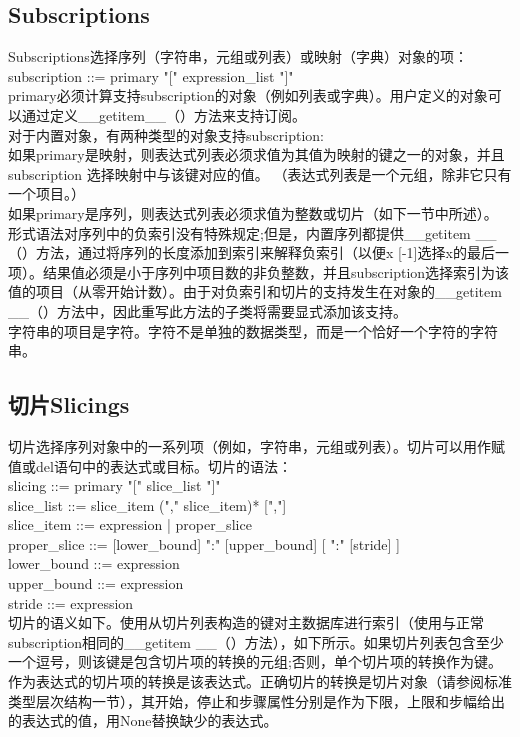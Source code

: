 \documentclass[10pt,UTF8]{ctexart}
\begin{document}
\subsection{Subscriptions}
Subscriptions选择序列（字符串，元组或列表）或映射（字典）对象的项：\\
subscription ::=  primary "[" expression_list "]"\\
\indent primary必须计算支持subscription的对象（例如列表或字典）。用户定义的对象可以通过定义__getitem__（）方法来支持订阅。\\
\indent 对于内置对象，有两种类型的对象支持subscription:\\
\indent 如果primary是映射，则表达式列表必须求值为其值为映射的键之一的对象，并且 subscription 选择映射中与该键对应的值。 （表达式列表是一个元组，除非它只有一个项目。）\\
\indent 如果primary是序列，则表达式列表必须求值为整数或切片（如下一节中所述）。\\
\indent 形式语法对序列中的负索引没有特殊规定;但是，内置序列都提供__getitem __（）方法，通过将序列的长度添加到索引来解释负索引（以便x [-1]选择x的最后一项）。结果值必须是小于序列中项目数的非负整数，并且subscription选择索引为该值的项目（从零开始计数）。由于对负索引和切片的支持发生在对象的__getitem __（）方法中，因此重写此方法的子类将需要显式添加该支持。\\
\indent 字符串的项目是字符。字符不是单独的数据类型，而是一个恰好一个字符的字符串。
\subsection{切片Slicings}
切片选择序列对象中的一系列项（例如，字符串，元组或列表）。切片可以用作赋值或del语句中的表达式或目标。切片的语法：\\
slicing      ::=  primary "[" slice_list "]"\\
slice_list   ::=  slice_item ("," slice_item)* [","]\\
slice_item   ::=  expression | proper_slice\\
proper_slice ::=  [lower_bound] ":" [upper_bound] [ ":" [stride] ]\\
lower_bound  ::=  expression\\
upper_bound  ::=  expression\\
stride       ::=  expression\\
\indent 切片的语义如下。使用从切片列表构造的键对主数据库进行索引（使用与正常subscription相同的__getitem __（）方法），如下所示。如果切片列表包含至少一个逗号，则该键是包含切片项的转换的元组;否则，单个切片项的转换作为键。作为表达式的切片项的转换是该表达式。正确切片的转换是切片对象（请参阅标准类型层次结构一节），其开始，停止和步骤属性分别是作为下限，上限和步幅给出的表达式的值，用None替换缺少的表达式。
\end{document}
